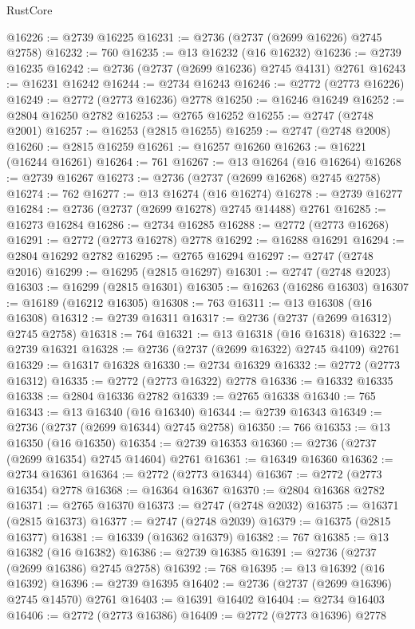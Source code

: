 \begin{lexlean}{RustCore}
\begin{coremodule}
@16226 := @2739 @16225
@16231 := @2736 (@2737 (@2699 @16226) @2745 @2758)
@16232 := 760
@16235 := @13 @16232 (@16 @16232)
@16236 := @2739 @16235
@16242 := @2736 (@2737 (@2699 @16236) @2745 @4131) @2761
@16243 := @16231 @16242
@16244 := @2734 @16243
@16246 := @2772 (@2773 @16226)
@16249 := @2772 (@2773 @16236) @2778
@16250 := @16246 @16249
@16252 := @2804 @16250 @2782
@16253 := @2765 @16252
@16255 := @2747 (@2748 @2001)
@16257 := @16253 (@2815 @16255)
@16259 := @2747 (@2748 @2008)
@16260 := @2815 @16259
@16261 := @16257 @16260
@16263 := @16221 (@16244 @16261)
@16264 := 761
@16267 := @13 @16264 (@16 @16264)
@16268 := @2739 @16267
@16273 := @2736 (@2737 (@2699 @16268) @2745 @2758)
@16274 := 762
@16277 := @13 @16274 (@16 @16274)
@16278 := @2739 @16277
@16284 := @2736 (@2737 (@2699 @16278) @2745 @14488) @2761
@16285 := @16273 @16284
@16286 := @2734 @16285
@16288 := @2772 (@2773 @16268)
@16291 := @2772 (@2773 @16278) @2778
@16292 := @16288 @16291
@16294 := @2804 @16292 @2782
@16295 := @2765 @16294
@16297 := @2747 (@2748 @2016)
@16299 := @16295 (@2815 @16297)
@16301 := @2747 (@2748 @2023)
@16303 := @16299 (@2815 @16301)
@16305 := @16263 (@16286 @16303)
@16307 := @16189 (@16212 @16305)
@16308 := 763
@16311 := @13 @16308 (@16 @16308)
@16312 := @2739 @16311
@16317 := @2736 (@2737 (@2699 @16312) @2745 @2758)
@16318 := 764
@16321 := @13 @16318 (@16 @16318)
@16322 := @2739 @16321
@16328 := @2736 (@2737 (@2699 @16322) @2745 @4109) @2761
@16329 := @16317 @16328
@16330 := @2734 @16329
@16332 := @2772 (@2773 @16312)
@16335 := @2772 (@2773 @16322) @2778
@16336 := @16332 @16335
@16338 := @2804 @16336 @2782
@16339 := @2765 @16338
@16340 := 765
@16343 := @13 @16340 (@16 @16340)
@16344 := @2739 @16343
@16349 := @2736 (@2737 (@2699 @16344) @2745 @2758)
@16350 := 766
@16353 := @13 @16350 (@16 @16350)
@16354 := @2739 @16353
@16360 := @2736 (@2737 (@2699 @16354) @2745 @14604) @2761
@16361 := @16349 @16360
@16362 := @2734 @16361
@16364 := @2772 (@2773 @16344)
@16367 := @2772 (@2773 @16354) @2778
@16368 := @16364 @16367
@16370 := @2804 @16368 @2782
@16371 := @2765 @16370
@16373 := @2747 (@2748 @2032)
@16375 := @16371 (@2815 @16373)
@16377 := @2747 (@2748 @2039)
@16379 := @16375 (@2815 @16377)
@16381 := @16339 (@16362 @16379)
@16382 := 767
@16385 := @13 @16382 (@16 @16382)
@16386 := @2739 @16385
@16391 := @2736 (@2737 (@2699 @16386) @2745 @2758)
@16392 := 768
@16395 := @13 @16392 (@16 @16392)
@16396 := @2739 @16395
@16402 := @2736 (@2737 (@2699 @16396) @2745 @14570) @2761
@16403 := @16391 @16402
@16404 := @2734 @16403
@16406 := @2772 (@2773 @16386)
@16409 := @2772 (@2773 @16396) @2778

\end{coremodule}
\end{lexlean}
